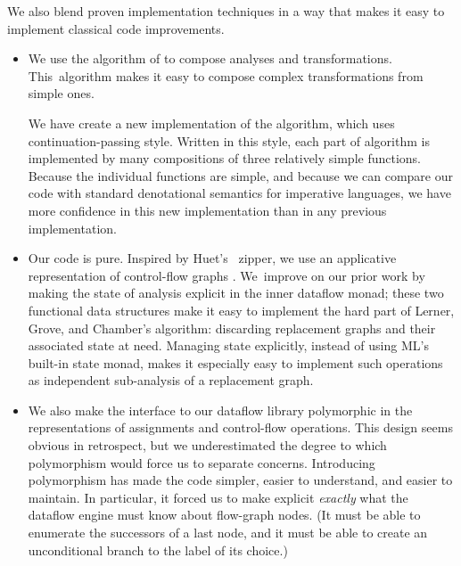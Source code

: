 \documentclass[blockstyle,preprint,natbib,nocopyrightspace]{sigplanconf}
\let\cite\citep
\newcommand{\authornote}[1]{{\em #1}}
\def\authornote#1{\unskip\relax}
\newcommand{\simon}[1]{\authornote{SLPJ: #1}}
\def\finalremark#1{\relax}
\begin{document}
We also blend proven implementation techniques
in a way that
makes it easy
to implement classical code improvements.
\begin{itemize}
\item
We use the algorithm of \citet{lerner-grove-chambers:2002} to 
compose analyses and transformations.
This~algorithm makes it easy to compose complex transformations
from simple ones.

We have create a new implementation of the algorithm, which uses
continuation-passing style.
Written in this style, each part of algorithm is implemented by many
compositions of three relatively simple functions.
Because the individual functions are simple, and because we can
compare our code with standard denotational semantics for imperative
languages, we have more confidence in this new implementation than in
any previous implementation. 
\item
Our code is pure.
Inspired by Huet's~\citeyearpar{huet:zipper} zipper,
we use an applicative representation of
control-flow graphs
\cite{ramsey-dias:applicative-flow-graph}. 
We~improve on our prior work by making the state of analysis
explicit in the inner dataflow monad;
these two functional data structures make it easy to implement the hard
part of Lerner, Grove, and Chamber's algorithm: discarding replacement
graphs and their associated state at need.
Managing state explicitly, instead of
using ML's built-in state monad, 
makes it especially easy to implement such
operations as independent sub-analysis of a replacement graph. \simon{This 
last sentence is a repeat of the previous one.}
%
%
\item
We also make 
the interface to our dataflow library polymorphic in the
representations of 
assignments and control-flow operations.
%
This design seems obvious in retrospect,
but we underestimated the degree to which polymorphism would force us to
separate concerns.
Introducing polymorphism has made the code simpler, easier
to understand, and easier to maintain.\finalremark
{SLPJ: Is it possible to substantiate this claim by [more] examples?}
In particular, it forced us to make explicit \emph{exactly} what the
dataflow engine must know about flow-graph nodes.
(It must be able to enumerate the successors of a last
node, and it must be able to create an unconditional branch to the
label of its choice.)
\end{itemize}
\end{document}
